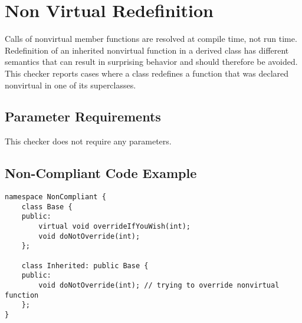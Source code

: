 %
%

\section{Non Virtual Redefinition}
\label{NonVirtualRedefinition::overview}

Calls of nonvirtual member functions are resolved at compile time, not run
time. Redefinition of an inherited nonvirtual function in a derived class has
different semantics that can result in surprising behavior and should
therefore be avoided. This checker reports cases where a class redefines a
function that was declared nonvirtual in one of its superclasses.

\subsection{Parameter Requirements}

This checker does not require any parameters.

\subsection{Non-Compliant Code Example}

\begin{verbatim}
namespace NonCompliant {
    class Base {
    public:
        virtual void overrideIfYouWish(int);
        void doNotOverride(int);
    };

    class Inherited: public Base {
    public:
        void doNotOverride(int); // trying to override nonvirtual function
    };
}
\end{verbatim}

